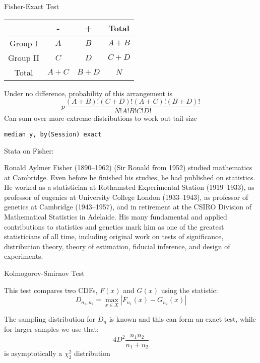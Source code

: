 \documentclass{beamer}
\begin{document}
\begin{frame}{Fisher-Exact Test}
\begin{card}
\begin{center}
\begin{tabular}{cccc}
&  -  & + & Total\\ 	\hline
	Group I & $A$  & $B$ & $A+B$ \\
	Group II & $C$ & $D$ & $C+D$ \\\cline{2-4}
	Total & $A+C$ & $B+D$ & $N$
\end{tabular}
\end{center}
\end{card}
\begin{card}
 Under no difference, probability of this arrangement is $$p\frac{(A+B)!(C+D)!(A+C)!(B+D)!}{N!A!B!C!D!}$$
Can sum over more extreme distributions to work out tail size
\end{card}
\end{frame}

\begin{frame}
    \begin{card}[STATA]
        \texttt{median y, by(Session) exact}
    \end{card}
\end{frame}


\begin{frame}{Stata on Fisher:}
\begin{card}
Ronald Aylmer Fisher (1890--1962) (Sir Ronald from 1952) studied mathematics at Cambridge. Even before he finished his studies, he had published on statistics. He worked as a statistician at Rothamsted Experimental Station (1919--1933), as professor of eugenics at University College London (1933--1943), as professor of genetics at Cambridge (1943--1957), and in retirement at the CSIRO Division of Mathematical Statistics in Adelaide. His many fundamental and applied contributions to statistics and genetics mark him as one of the greatest statisticians of all time, including original work on tests of significance, distribution theory, theory of estimation, fiducial inference, and design of experiments.
\end{card}
\end{frame}

\begin{frame}{Kolmogorov-Smirnov Test}
	\begin{card}
This test compares two CDFs, $F(x)$ and $G(x)$ using the statistic:
			$$D_{n_1,n_2}= \max_{x\in X} \left| F_{n_1}(x)-G_{n_2}(x)  \right|$$
			\end{card}
\begin{card} The sampling distribution for $D_n$ is known and this can form an exact test, while for larger samples we use that:
		$$4 D^2 \frac{n_1 n_2}{n_1+n_2}$$
	is asymptotically a $\chi^2_2$ distribution
	\end{card}
\end{frame}
\end{document}
